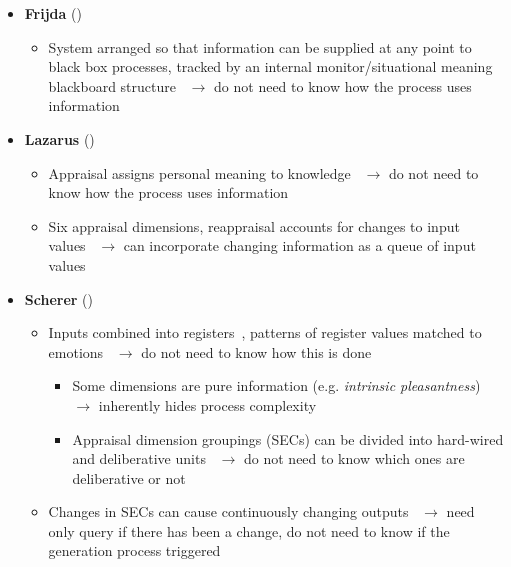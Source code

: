 \begin{itemize}
    \item \textbf{Frijda} (\strong)
    \begin{itemize}
        \item System arranged so that information can be supplied at any point
        to black box processes, tracked by an internal monitor/situational
        meaning blackboard structure~\citep[p.~455--456,
        459]{frijda1986emotions} $\rightarrow$ do not need to know how the
        process uses information
    \end{itemize}

    \item \textbf{Lazarus} (\strong)
    \begin{itemize}
        \item Appraisal assigns personal meaning to
        knowledge~\citep[p.~145]{lazarus1991emotion} $\rightarrow$ do not need
        to know how the process uses information

        \item Six appraisal dimensions, reappraisal accounts for changes to
        input values~\citep[p.~134, 149--150]{lazarus1991emotion} $\rightarrow$
        can incorporate changing information as a queue of input values
    \end{itemize}

    \item \textbf{Scherer} (\strong)
    \begin{itemize}
        \item Inputs combined into
        registers~\citep[p.~105]{scherer2001appraisalB}, patterns of register
        values matched to emotions~\citep[p.~114--115]{scherer2001appraisalB}
        $\rightarrow$ do not need to know how this is done
        \begin{itemize}
            \item Some dimensions are pure information (e.g. \textit{intrinsic
                pleasantness})~\citep[p.~146]{lazarus1991emotion} $\rightarrow$
            inherently hides process complexity

            \item Appraisal dimension groupings (SECs) can be divided into
            hard-wired and deliberative
            units~\citep[p.~102]{scherer2001appraisalB} $\rightarrow$ do not
            need to know which ones are deliberative or not
        \end{itemize}

        \item Changes in SECs can cause continuously changing
        outputs~\citep[p.~107]{scherer2001appraisalB} $\rightarrow$ need only
        query if there has been a change, do not need to know if the generation
        process triggered
    \end{itemize}


\end{itemize}
